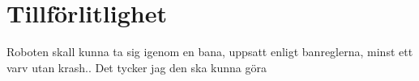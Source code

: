 \section{Tillförlitlighet}
Roboten skall kunna ta sig igenom en bana, uppsatt enligt banreglerna, minst ett varv utan krash.. Det tycker jag den ska kunna göra